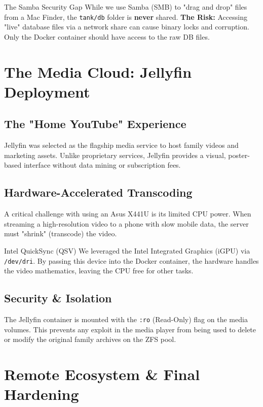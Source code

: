 \documentclass[12pt,a4paper,oneside]{book}
\begin{document}
\begin{techwarning}{The Samba Security Gap}
While we use Samba (SMB) to "drag and drop" files from a Mac Finder, the \texttt{tank/db} folder is \textbf{never} shared. 
\textbf{The Risk:} Accessing "live" database files via a network share can cause binary locks and corruption. Only the Docker container should have access to the raw DB files.
\end{techwarning}

\chapter{The Media Cloud: Jellyfin Deployment}

\section{The "Home YouTube" Experience}
Jellyfin was selected as the flagship media service to host family videos and marketing assets. Unlike proprietary services, Jellyfin provides a visual, poster-based interface without data mining or subscription fees.

\section{Hardware-Accelerated Transcoding}
A critical challenge with using an Asus X441U is its limited CPU power. When streaming a high-resolution video to a phone with slow mobile data, the server must "shrink" (transcode) the video. 

\begin{conceptbox}{Intel QuickSync (QSV)}
We leveraged the Intel Integrated Graphics (iGPU) via \texttt{/dev/dri}. By passing this device into the Docker container, the hardware handles the video mathematics, leaving the CPU free for other tasks.
\end{conceptbox}

\section{Security \& Isolation}
The Jellyfin container is mounted with the \texttt{:ro} (Read-Only) flag on the media volumes. This prevents any exploit in the media player from being used to delete or modify the original family archives on the ZFS pool.

\chapter{Remote Ecosystem \& Final Hardening}
\end{document}
